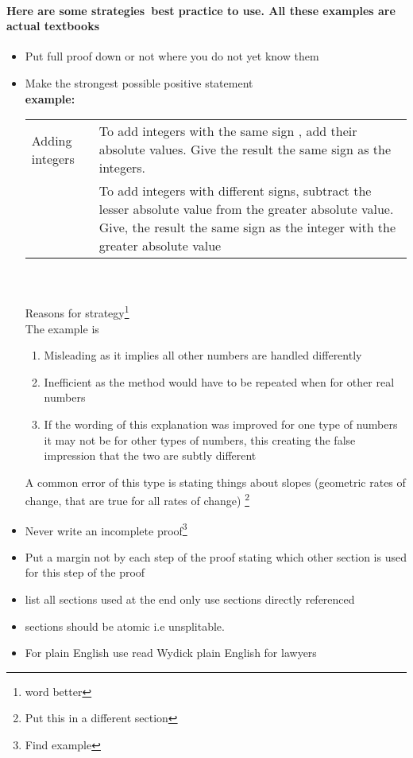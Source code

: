 \documentclass{article}
\begin{document}
\paragraph{Here are some strategies\ best practice to use. All these examples are actual textbooks}
\begin{itemize}
\item{Put full proof down or not where you do not yet know them}
\item{Make the strongest possible positive statement\\ \textbf{example:}\\ 
\begin{tabular}{|l|p{14cm}|} 
\hline
Adding integers & To add integers with the same sign , add their absolute values. Give the result the same sign as the integers. \\ & To add integers with different signs, subtract the lesser absolute value from the greater absolute value. Give, the result the same sign as the integer with the greater absolute value \\ \hline
\end{tabular} 
\\ \\
Reasons for strategy\footnote {word better} \\ The example is \begin{enumerate} \item{Misleading as it implies all other numbers are handled differently }\item{ Inefficient as the method would have to be repeated when for other real numbers}\item{If the wording of this explanation was improved for one type of numbers it may not be for other types of numbers, this creating the false impression that the two are subtly different} \end{enumerate}
A common error of this type is stating things about slopes (geometric rates of change, that are true for all rates of change) \footnote{Put this in a different section}}
\item{Never write an incomplete proof}\footnote{Find example}
\item{Put a margin not by each step of the proof stating which other section is used for this step of the proof}
\item{list all sections used at the end only use sections directly referenced}
\item{sections should be atomic i.e unsplitable.}
\item{For plain English use read Wydick plain English for lawyers}

\end{itemize}
\end{document}
